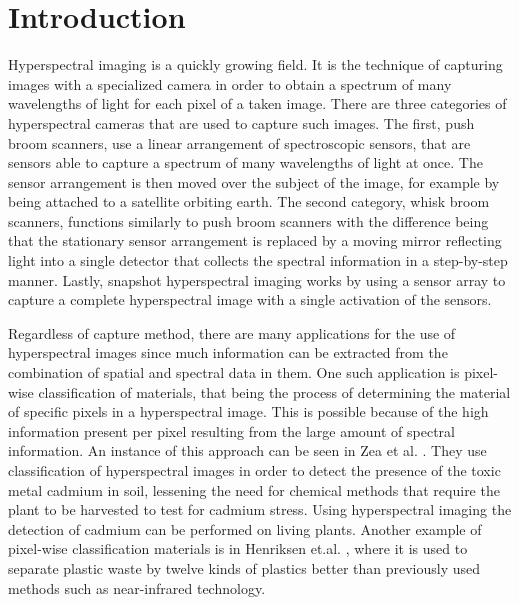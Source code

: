 \chapter{Introduction\label{cha:chapter1}}
Hyperspectral imaging is a quickly growing field. It is the technique of capturing images with a specialized camera in order to obtain a spectrum of many wavelengths of light for each pixel of a taken image. There are three categories of hyperspectral cameras that are used to capture such images. The first, push broom scanners, use a linear arrangement of spectroscopic sensors, that are sensors able to capture a spectrum of many wavelengths of light at once. The sensor arrangement is then moved over the subject of the image, for example by being attached to a satellite orbiting earth. The second category, whisk broom scanners, functions similarly to push broom scanners with the difference being that the stationary sensor arrangement is replaced by a moving mirror reflecting light into a single detector that collects the spectral information in a step-by-step manner. Lastly, snapshot hyperspectral imaging works by using a sensor array to capture a complete hyperspectral image with a single activation of the sensors. 

Regardless of capture method, there are many applications for the use of hyperspectral images since much information can be extracted from the combination of spatial and spectral data in them. One such application is pixel-wise classification of materials, that being the process of determining the material of specific pixels in a hyperspectral image. This is possible because of the high information present per pixel resulting from the large amount of spectral information. An instance of this approach can be seen in Zea et al. \citep{zea_leveraging_2022}. They use classification of hyperspectral images in order to detect the presence of the toxic metal cadmium in soil, lessening the need for chemical methods that require the plant to be harvested to test for cadmium stress. Using hyperspectral imaging the detection of cadmium can be performed on living plants. Another example of pixel-wise classification materials is in Henriksen et.al. \citep{henriksen_plastic_2022}, where it is used to separate plastic waste by twelve kinds of plastics better than previously used methods such as near-infrared technology.

